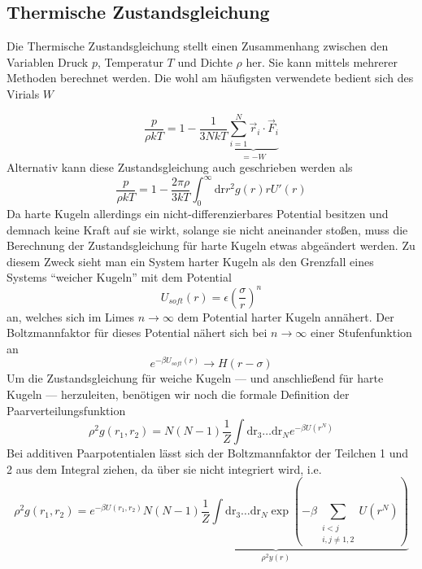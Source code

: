 \subsection{Thermische Zustandsgleichung}
Die Thermische Zustandsgleichung stellt einen Zusammenhang zwischen den Variablen Druck $p$, Temperatur $T$ und Dichte $\rho$ her. Sie kann mittels mehrerer Methoden berechnet werden. Die wohl am häufigsten verwendete bedient sich des Virials $W$  

\begin{equation}
\frac{p}{\rho k T} = 1 - \frac{1}{3NkT}\underbrace{\sum_{i=1}^N \vec{r}_i \cdot \vec{F}_i}_{= - W}
\end{equation}
Alternativ kann diese Zustandsgleichung auch geschrieben werden als 
\begin{equation}
\frac{p}{\rho k T} = 1 - \frac{2\pi\rho}{3kT} \int_0^{\infty} \text{dr} r^2 g(r) r U'(r)  
\label{eos2}
\end{equation}
Da harte Kugeln allerdings ein nicht-differenzierbares Potential besitzen und demnach keine Kraft auf sie wirkt, solange sie nicht aneinander stoßen, muss die Berechnung der Zustandsgleichung für harte Kugeln etwas abgeändert werden.
Zu diesem Zweck sieht man ein System harter Kugeln als den Grenzfall eines Systems "`weicher Kugeln"' mit dem Potential 
\begin{equation}
U_{soft}(r) = \epsilon \left(\frac{\sigma}{r}\right)^n 
\end{equation}
an, welches sich im Limes $n \rightarrow \infty$ dem Potential harter Kugeln annähert. Der Boltzmannfaktor für dieses Potential nähert sich bei $n \rightarrow \infty$ einer Stufenfunktion an
\begin{equation}
e^{-\beta U_{soft}(r)} \rightarrow H(r-\sigma)
\end{equation} 
Um die Zustandsgleichung für weiche Kugeln --- und anschließend für harte Kugeln --- herzuleiten, benötigen wir noch die formale Definition der Paarverteilungsfunktion
\begin{equation}
\rho^2 g(r_1, r_2) = N(N-1) \frac{1}{Z} \int \text{dr}_3 \ldots \text{dr}_N e^{-\beta U(r^N)}
\end{equation}
Bei additiven Paarpotentialen lässt sich der Boltzmannfaktor der Teilchen 1 und 2 aus dem Integral ziehen, da über sie nicht integriert wird, i.e. 
\begin{equation}
\rho^2 g(r_1, r_2) = e^{-\beta U(r_1, r_2)} \underbrace{N(N-1) \frac{1}{Z} \int \text{dr}_3 \ldots \text{dr}_N \exp{\left(-\beta \sum\limits_{\substack{i<j \\ i,j \neq {1,2}}} U(r^N)\right)}}_{\rho^2 y(r)}
\end{equation}
